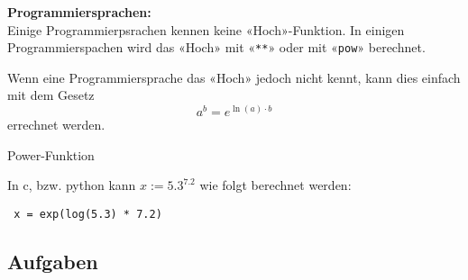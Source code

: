 \vspace{22mm}

\textbf{Programmiersprachen:}\\


Einige Programmierpsrachen kennen keine «Hoch»-Funktion. In einigen
Programmierspachen wird das «Hoch» mit «\texttt{**}» oder mit
«\texttt{pow}» berechnet.

Wenn eine Programmiersprache das «Hoch» jedoch nicht kennt, kann dies
einfach mit dem Gesetz
$$a^b = e^{\ln(a)\cdot{} b}$$
errechnet werden.

\begin{beispiel}{Power-Funktion}{}

  In c, bzw. python kann $x:=5.3^{7.2}$ wie folgt berechnet werden:

  \begin{center}{\texttt{ x = exp(log(5.3) * 7.2) }}\end{center}

\end{beispiel}


\newpage
\subsection*{Aufgaben}

